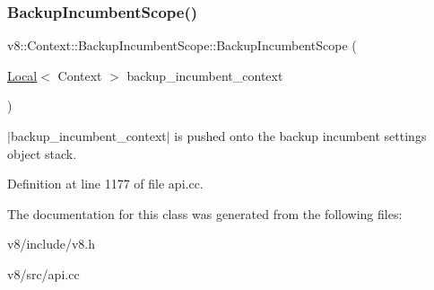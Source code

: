 \subsubsection{\texorpdfstring{Backup\+Incumbent\+Scope()}{BackupIncumbentScope()}}
{\footnotesize\ttfamily v8\+::\+Context\+::\+Backup\+Incumbent\+Scope\+::\+Backup\+Incumbent\+Scope (\begin{DoxyParamCaption}\item[{\mbox{\hyperlink{classv8_1_1Local}{Local}}$<$ Context $>$}]{backup\+\_\+incumbent\+\_\+context }\end{DoxyParamCaption})\hspace{0.3cm}{\ttfamily [explicit]}}

$\vert$backup\+\_\+incumbent\+\_\+context$\vert$ is pushed onto the backup incumbent settings object stack. 

Definition at line 1177 of file api.\+cc.



The documentation for this class was generated from the following files\+:\begin{DoxyCompactItemize}
\item 
v8/include/v8.\+h\item 
v8/src/api.\+cc\end{DoxyCompactItemize}
